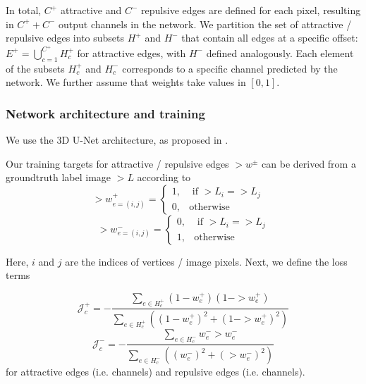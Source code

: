 In total, $C^+$ attractive and $C^-$ repulsive edges are defined for each pixel, resulting in $C^+ + C^-$ output channels in the network. 
We partition the set of attractive / repulsive edges into subsets $H^+$ and $H^-$ that contain all edges at a specific offset:
$\label{edgesets}
    E^+ = {\bigcup_{c=1}^{C^+}} H^+_{c}$ for attractive edges, with $H^{-}$ defined analogously. 
Each element of the subsets $H^+_{c}$ and $H^-_{c}$ corresponds to a specific channel predicted by the network. We further assume that weights take values in $[0,1]$.%

\subsubsection*{Network architecture and training}
We use the 3D U-Net \cite{ronneberger_15_u-net, cciccek20163d} architecture, as proposed in \cite{funke2018large}. %

Our training targets for attractive / repulsive edges $\gt{w}^\pm$ can be derived from a groundtruth label image $\gt{L}$ according to
\begin{equation}
    \gt{w}^+_{e=(i, j)} = \begin{cases}
        1 , &\text{ if } \gt{L}_i = \gt{L}_j\\
        0 , & \text{otherwise}
    \end{cases}\quad
\end{equation}
\begin{equation}
    \gt{w}^-_{e=(i, j)} = \begin{cases}
        0 , &\text{ if } \gt{L}_i = \gt{L}_j\\
        1 , & \text{otherwise}
    \end{cases}
\end{equation}

Here, $i$ and $j$ are the indices of vertices / image pixels.
Next, we define the loss terms

\begin{equation} \label{dice_plus}
    \mathcal{J}^+_{c} = - \frac{\sum_{e \in H^+_{c}} (1 - w^+_e) (1 - \gt{w}^+_e)}{\sum_{e \in H^+_{c}} ((1 - w^+_e)^2 + (1 -\gt{w}^+_e)^2)} 
\end{equation}\label{dice_minus}
\begin{equation}
 \mathcal{J}^-_{c} = - \frac{\sum_{e \in H^-_{c}} w^-_e {\gt{w}^-_e}}{\sum_{e \in H^-_{c}} ((w^-_e)^2 + (\gt{w}^-_e)^2)}
\end{equation}
for attractive edges (i.e. channels) and repulsive edges (i.e. channels).

